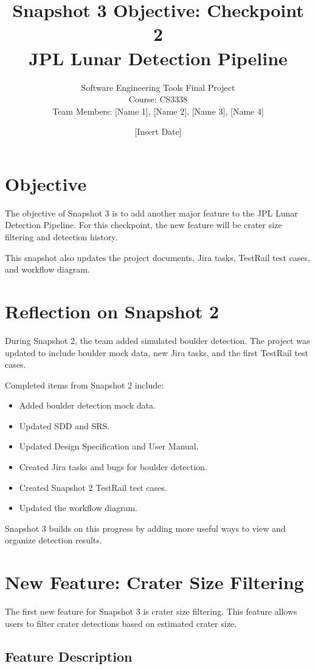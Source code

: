 \documentclass[12pt]{article}
\title{
    \textbf{Snapshot 3 Objective: Checkpoint 2} \\
    JPL Lunar Detection Pipeline
}
\author{
    Software Engineering Tools Final Project \\
    Course: CS3338 \\
    Team Members: [Name 1], [Name 2], [Name 3], [Name 4]
}
\date{[Insert Date]}
\begin{document}
\maketitle
\newpage

\section{Objective}

The objective of Snapshot 3 is to add another major feature to the JPL Lunar Detection Pipeline. For this checkpoint, the new feature will be crater size filtering and detection history.

This snapshot also updates the project documents, Jira tasks, TestRail test cases, and workflow diagram.

\section{Reflection on Snapshot 2}

During Snapshot 2, the team added simulated boulder detection. The project was updated to include boulder mock data, new Jira tasks, and the first TestRail test cases.

Completed items from Snapshot 2 include:

\begin{itemize}
    \item Added boulder detection mock data.
    \item Updated SDD and SRS.
    \item Updated Design Specification and User Manual.
    \item Created Jira tasks and bugs for boulder detection.
    \item Created Snapshot 2 TestRail test cases.
    \item Updated the workflow diagram.
\end{itemize}

Snapshot 3 builds on this progress by adding more useful ways to view and organize detection results.

\section{New Feature: Crater Size Filtering}

The first new feature for Snapshot 3 is crater size filtering. This feature allows users to filter crater detections based on estimated crater size.

\subsection{Feature Description}
\end{document}
